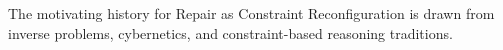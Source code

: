The motivating history for Repair as Constraint Reconfiguration is drawn from inverse problems, cybernetics, and constraint-based reasoning traditions.
